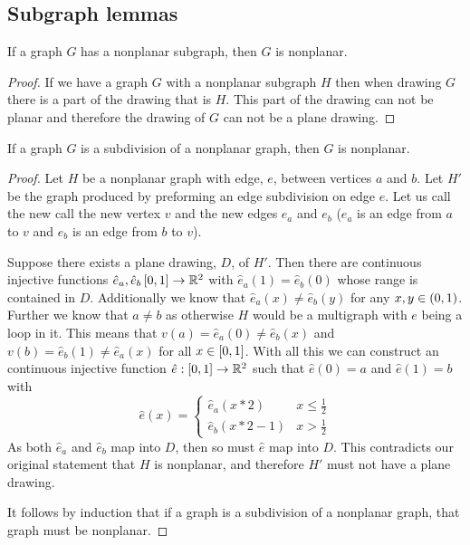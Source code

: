 \documentclass{article}
\begin{document}
\subsection{Subgraph lemmas}

\begin{lemma} \label{subgraph}
	If a graph $G$ has a nonplanar subgraph, then $G$ is nonplanar.
\end{lemma}

\begin{proof}
	If we have a graph $G$ with a nonplanar subgraph $H$ then when drawing $G$ there is a part of the drawing that is $H$. This part of the drawing can not be planar and therefore the drawing of $G$ can not be a plane drawing.
\end{proof}

\begin{lemma} \label{subdivision}
	If a graph $G$ is a subdivision of a nonplanar graph, then $G$ is nonplanar.
\end{lemma}

\begin{proof}
	Let $H$ be a nonplanar graph with edge, $e$, between vertices $a$ and $b$. Let $H'$ be the graph produced by preforming an edge subdivision on edge $e$. Let us call the new call the new vertex $v$ and the new edges $e_a$ and $e_b$ ($e_a$ is an edge from $a$ to $v$ and $e_b$ is an edge from $b$ to $v$).
	
	Suppose there exists a plane drawing, $D$, of $H'$. Then there are continuous injective functions $\hat e_a,\hat e_b\left[ {0} , {1} \right]\to\mathbb R^2$ with $\hat e_a(1) = \hat e_b(0)$ whose range is contained in $D$. Additionally we know that $\hat e_a(x) \not= \hat e_b(y)$ for any $x,y\in\left( {0} , {1} \right)$. Further we know that $a\not=b$ as otherwise $H$ would be a multigraph with $e$ being a loop in it. This means that $v(a) = \hat e_a(0) \not= \hat e_b(x)$ and $v(b) = \hat e_b(1)\not=\hat e_a(x)$ for all $x\in\left[ {0} , {1} \right]$. With all this we can construct an continuous injective function $\hat e:\left[ {0} , {1} \right]\to \mathbb R^2$ such that $\hat e(0) = a$ and $\hat e(1) = b$ with 
	$$\hat e(x) = \begin{cases}
	\hat e_a(x*2) & x \le \frac12\\
	\hat e_b(x*2-1) & x > \frac 12
	\end{cases}$$
	As both $\hat e_a$ and $\hat e_b$ map into $D$, then so must $\hat e$ map into $D$. This contradicts our original statement that $H$ is nonplanar, and therefore $H'$ must not have a plane drawing.
	
	It follows by induction that if a graph is a subdivision of a nonplanar graph, that graph must be nonplanar.
\end{proof}
\end{document}
